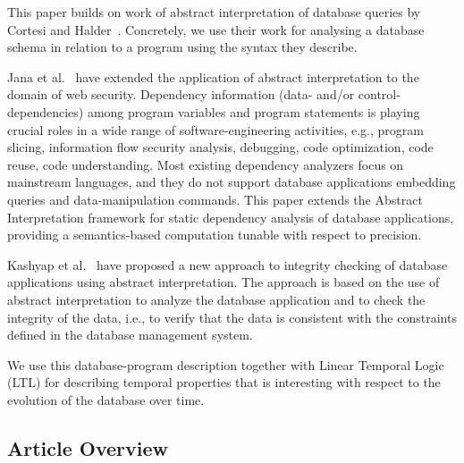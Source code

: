 

This paper builds on work of abstract interpretation of database queries by Cortesi and Halder~\cite{halder_abstract_2012}.
Concretely, we use their work for analysing a database schema in relation to a program using the syntax they describe.


Jana et al.~\cite{jana_extending_2020} have extended the application of abstract interpretation to the domain of web security.
Dependency information (data- and/or control-dependencies) among program variables and program statements is playing crucial roles in a wide range of software-engineering activities, e.g., program slicing, information flow security analysis, debugging, code optimization, code reuse, code understanding.
Most existing dependency analyzers focus on mainstream languages, and they do not support database applications embedding queries and data-manipulation commands.
This paper extends the Abstract Interpretation framework for static dependency analysis of database applications, providing a semantics-based computation tunable with respect to precision.

Kashyap et al.~\cite{kashyap_integrity_2022} have proposed a new approach to integrity checking of database applications using abstract interpretation.
The approach is based on the use of abstract interpretation to analyze the database application and to check the integrity of the data, i.e., to verify that the data is consistent with the constraints defined in the database management system.

We use this database-program description together with Linear Temporal Logic (LTL) for describing temporal properties that is interesting with respect to the evolution of the database over time.

\subsection{Article Overview}\label{subsec:article-overview}

